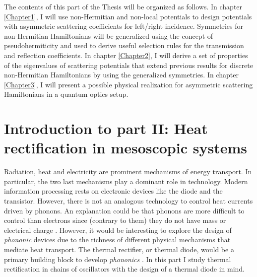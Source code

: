 The contents of this part of the Thesis will be organized as follows. In chapter \ref{Chapter1}, I will use non-Hermitian and non-local potentials to design potentials with asymmetric scattering coefficients for left/right incidence. Symmetries for non-Hermitian Hamiltonians will be generalized using the concept of pseudohermiticity \cite{Mostafazadeh2002} and used to derive useful selection rules for the transmission and reflection coefficients. In chapter \ref{Chapter2}, I will derive a set of properties of the eigenvalues of scattering potentials that extend previous results for discrete non-Hermitian Hamiltonians by using the generalized symmetries. In chapter \ref{Chapter3}, I will present a possible physical realization for asymmetric scattering Hamiltonians in a quantum optics setup.


\section*{Introduction to part II: Heat rectification in mesoscopic systems}

Radiation, heat and electricity are prominent mechanisms of energy transport. In particular, the two last mechanisms play a dominant role in technology. Modern information processing rests on electronic devices like the diode and the transistor. However, there is not an analogous technology to control heat currents driven by phonons. An explanation could be that phonons are more difficult to control than electrons since (contrary to them) they do not have mass or electrical charge \cite{Li2012}. However, it would be interesting to explore the design of \textit{phononic} devices due to the richness of different physical mechanisms that mediate heat transport. The thermal rectifier, or thermal diode, would be a primary building block to develop \textit{phononics} \cite{Li2012}. In this part I study thermal rectification in chains of oscillators with the design of a thermal diode in mind.

